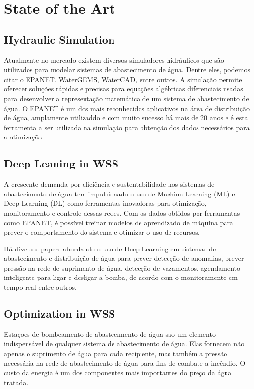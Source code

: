 \chapter{State of the Art}%
\label{chapter:state-of-the-art}



\section{Hydraulic Simulation}

Atualmente no mercado existem diversos simuladores hidráulicos que são utilizados para modelar sistemas de abastecimento de água. Dentre eles, podemos citar o EPANET, WaterGEMS, WaterCAD, entre outros. A simulação permite oferecer soluções rápidas e precisas para equações algébricas diferenciais usadas para desenvolver a representação matemática de um sistema de abastecimento de água\cite{rfc1}. O EPANET é um dos mais reconhecidos aplicativos na área de distribuição de água\cite{rfc4}, amplamente utilizaddo e com muito sucesso\cite{rfc5} há mais de 20 anos\cite{rfc6} e é esta ferramenta a ser utilizada na simulação para obtenção dos dados necessários para a otimização.


\section{Deep Leaning in WSS}

A crescente demanda por eficiência e sustentabilidade nos sistemas de abastecimento de água tem impulsionado o uso de Machine Learning (ML) e Deep Learning (DL) como ferramentas inovadoras para otimização, monitoramento e controle dessas redes. Com os dados obtidos por ferramentas como EPANET, é possível treinar modelos de aprendizado de máquina para prever o comportamento do sistema e otimizar o uso de recursos.

Há diversos papers abordando o uso de Deep Learning em sistemas de abastecimento e distribuição de água para prever detecção de anomalias\cite{rfc12}, prever pressão na rede de suprimento de água\cite{rfc11}, detecção de vazamentos\cite{rfc13}, agendamento inteligente para ligar e desligar a bomba, de acordo com o monitoramento em tempo real\cite{rfc9} entre outros.


\section{Optimization in WSS}

Estações de bombeamento de abastecimento de água são um elemento indispensável de qualquer sistema de abastecimento de água. Elas fornecem não apenas o suprimento de água para cada recipiente, mas também a pressão necessária na rede de abastecimento de água para fins de combate a incêndio. O custo da energia é um dos componentes mais importantes do preço da água tratada.\cite{rfc7}

